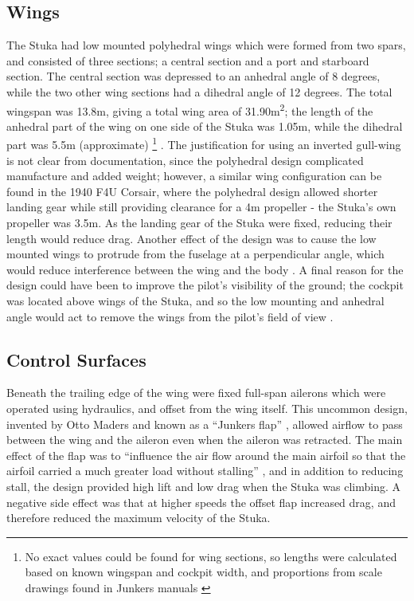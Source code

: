 \documentclass[a4paper, fontsize=11pt]{scrartcl} %
\begin{document}
\subsection{Wings}
The Stuka had low mounted polyhedral wings which were formed from two spars, and consisted of
three sections; a central section and a port and starboard section. The
central section was depressed to an anhedral angle of 8 degrees, while
the two other wing sections had a dihedral angle of 12
degrees. The total wingspan was 13.8m, giving a total wing area of
31.90m\textsuperscript{2}; the length of the anhedral
part of the wing on one side of the Stuka was 1.05m, while the dihedral part was
5.5m (approximate) 
\footnote{No exact values could be found for wing
  sections, so lengths were calculated based on known wingspan and cockpit
  width, and proportions from scale drawings found in Junkers manuals
  \autocite{manual39}
}
. The justification for using an inverted gull-wing
is not clear from documentation, since the polyhedral
design complicated manufacture and added weight; however, a similar wing
configuration can be found in the 1940 F4U Corsair, where the polyhedral
design allowed shorter landing gear while still providing clearance
for a 4m propeller \autocite{usni} - the Stuka's own propeller was 3.5m.
As the landing gear of the Stuka were fixed, reducing their length would reduce
drag. Another effect of the design was to cause the low
mounted wings to protrude from the fuselage at a perpendicular angle,
which would reduce interference between the wing and the body
\autocite[p~.203]{hartshorn31}. A final reason for the design could have
been to improve the pilot's visibility of the ground; the cockpit was
located above wings of the Stuka, and so the low mounting and
anhedral angle would act to remove the wings from the pilot's field of
view \autocite[p~.16]{guardia14}.

\subsection{Control Surfaces}
Beneath the trailing edge of the wing were fixed full-span
ailerons which were operated using hydraulics, and offset from the wing
itself. This uncommon design,
invented by Otto Maders and known as a ``Junkers flap'' \autocite{}, allowed airflow to pass
between the wing and the aileron even when the aileron was retracted.
The main effect of the flap was to ``influence the air flow around the main airfoil so
that the airfoil carried a much greater load without stalling''
\autocite[p~.14]{wenzinger38}, and in addition to reducing stall, the design
provided high lift and low drag when the Stuka was climbing. A negative
side effect was that at higher speeds the offset flap increased drag,
and therefore reduced the maximum velocity of the Stuka.
\end{document}
